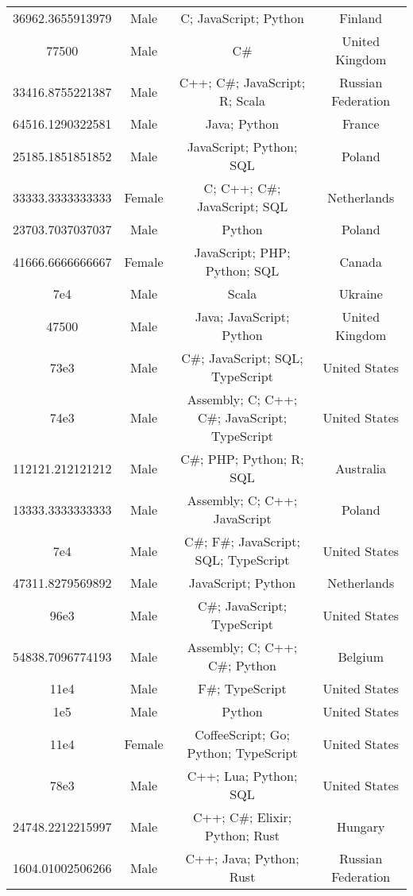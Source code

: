 \begin{center}
\begin{tabular}{ |c|c|c|c| }
36962.3655913979  &  Male  &  C; JavaScript; Python  &  Finland  \\ 
77500  &  Male  &  C\#  &  United Kingdom  \\ 
33416.8755221387  &  Male  &  C++; C\#; JavaScript; R; Scala  &  Russian Federation  \\ 
64516.1290322581  &  Male  &  Java; Python  &  France  \\ 
25185.1851851852  &  Male  &  JavaScript; Python; SQL  &  Poland  \\ 
33333.3333333333  &  Female  &  C; C++; C\#; JavaScript; SQL  &  Netherlands  \\ 
23703.7037037037  &  Male  &  Python  &  Poland  \\ 
41666.6666666667  &  Female  &  JavaScript; PHP; Python; SQL  &  Canada  \\ 
7e4  &  Male  &  Scala  &  Ukraine  \\ 
47500  &  Male  &  Java; JavaScript; Python  &  United Kingdom  \\ 
73e3  &  Male  &  C\#; JavaScript; SQL; TypeScript  &  United States  \\ 
74e3  &  Male  &  Assembly; C; C++; C\#; JavaScript; TypeScript  &  United States  \\ 
112121.212121212  &  Male  &  C\#; PHP; Python; R; SQL  &  Australia  \\ 
13333.3333333333  &  Male  &  Assembly; C; C++; JavaScript  &  Poland  \\ 
7e4  &  Male  &  C\#; F\#; JavaScript; SQL; TypeScript  &  United States  \\ 
47311.8279569892  &  Male  &  JavaScript; Python  &  Netherlands  \\ 
96e3  &  Male  &  C\#; JavaScript; TypeScript  &  United States  \\ 
54838.7096774193  &  Male  &  Assembly; C; C++; C\#; Python  &  Belgium  \\ 
11e4  &  Male  &  F\#; TypeScript  &  United States  \\ 
1e5  &  Male  &  Python  &  United States  \\ 
11e4  &  Female  &  CoffeeScript; Go; Python; TypeScript  &  United States  \\ 
78e3  &  Male  &  C++; Lua; Python; SQL  &  United States  \\ 
24748.2212215997  &  Male  &  C++; C\#; Elixir; Python; Rust  &  Hungary  \\ 
1604.01002506266  &  Male  &  C++; Java; Python; Rust  &  Russian Federation  \\ 

\end{tabular}
\end{center}
